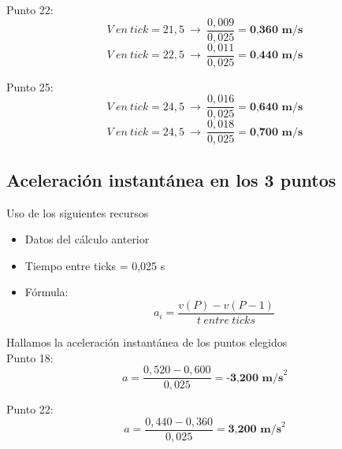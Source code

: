 \documentclass[10pt]{article}
\begin{document}
\vspace{0,25cm}
Punto 22:
 \begin{equation*}
    V~en~tick = 21,5 ~ \longrightarrow~ \frac{0,009}{0,025} = \textbf{0,360~m/s}
\end{equation*}
\vspace{0,1cm}
 \begin{equation*}
    V~en~tick = 22,5 ~ \longrightarrow ~ \frac{0,011}{0,025} = \textbf{0,440~m/s}
\end{equation*}

\vspace{0,25cm}
Punto 25:
 \begin{equation*}
    V~en~tick = 24,5 ~ \longrightarrow ~ \frac{0,016}{0,025} = \textbf{0,640~m/s}
\end{equation*}
\vspace{0,1cm}
 \begin{equation*}
    V~en~tick = 24,5 ~ \longrightarrow ~ \frac{0,018}{0,025} = \textbf{0,700~m/s}
\end{equation*}
\vspace{-1mm}

\subsection{Aceleración instantánea en los 3 puntos}\vspace{2mm}

Uso de los siguientes recursos
\begin{itemize}
    \item Datos del cálculo anterior
    \item Tiempo entre ticks = 0,025 s
    \item Fórmula:
    \large{\begin{equation}
        a_{i} = \frac{v(P) - v(P-1)}{t~entre~ticks}
    \end{equation}}
\end{itemize}\vspace{2cm}

Hallamos la aceleración instantánea de los puntos elegidos\\

Punto 18:
 \begin{equation*}
    a = \frac{0,520-0,600}{0,025} = \textbf{-3,200~m/s}^{2}
\end{equation*}
\vspace{0,2cm}

Punto 22:
 \begin{equation*}
    a = \frac{0,440-0,360}{0,025} = \textbf{3,200~m/s}^{2}
\end{equation*}
\vspace{0,2cm}
\end{document}
